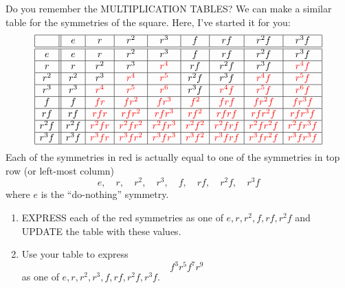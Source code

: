 \documentclass[noauthor,nooutcomes,hints,handout]{ximera}
\begin{document}
\begin{question}
  Do you remember the MULTIPLICATION TABLES? We can make a similar
  table for the symmetries of the square. Here, I've started it for
  you:
  \[
  \begin{array}{|c||c|c|c|c|c|c|c|c|}
    \hline
         & e    & r     & r^2     & r^3      & f      & rf     & r^2f      &  r^3 f\\ \hline\hline
    e    & e    & r     & r^2     & r^3      & f      & rf     & r^2f      &  r^3 f\\ \hline
    r    & r    & r^2   & r^3     & \color{red}r^4      & rf     & r^2f   & r^3f      & \color{red}r^4f\\ \hline
    r^2  & r^2  & r^3   & \color{red}r^4     & \color{red}r^5      & r^2f   & r^3f   & \color{red}r^4f      & \color{red}r^5f\\ \hline
    r^3  & r^3  & \color{red}r^4   & \color{red}r^5     & \color{red}r^6      & r^3f   & \color{red}r^4f   & \color{red}r^5f      & \color{red}r^6f\\ \hline
    f    & f    & \color{red}fr    & \color{red}fr^2    & \color{red}fr^3     & \color{red}f^2    & \color{red}frf    & \color{red}fr^2f     & \color{red}fr^3f\\ \hline
    rf   & rf   & \color{red}rfr   & \color{red}rfr^2   & \color{red}rfr^3    & \color{red}rf^2   & \color{red}rfrf   & \color{red}rfr^2f    & \color{red}rfr^3f\\ \hline
    r^2f & r^2f & \color{red}r^2fr & \color{red}r^2fr^2 & \color{red}r^2fr^3  & \color{red}r^2f^2 & \color{red}r^2frf & \color{red}r^2fr^2f  & \color{red}r^2fr^3f\\ \hline
    r^3f & r^3f & \color{red}r^3fr & \color{red}r^3fr^2 & \color{red}r^3fr^3  & \color{red}r^3f^2 & \color{red}r^3frf & \color{red}r^3f r^2f & \color{red}r^3fr^3f\\ \hline
  \end{array}
  \]
  Each of the symmetries in red is actually equal to one of the
  symmetries in top row (or left-most column)
  \[
  e,\quad r,\quad r^2,\quad r^3,\quad f,\quad rf,\quad r^2f,\quad r^3f
  \]
  where $e$ is the ``do-nothing'' symmetry.
  \begin{enumerate}
    \item EXPRESS each of the red symmetries as one of
      $e,r,r^2,f,rf,r^2f$ and UPDATE the table with these values.
    \item Use your table to express
      \[
      f^3r^5f^7r^9
      \]
      as one of $e,r,r^2,r^3,f,rf,r^2f, r^3f$.

\end{enumerate}
\end{question}
\end{document}
